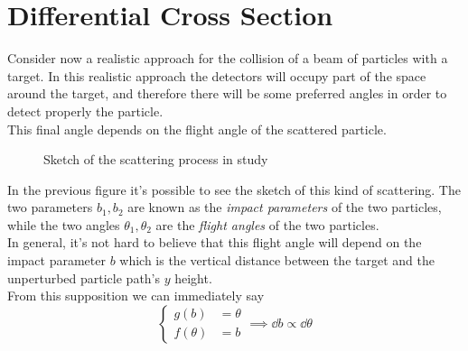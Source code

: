 \documentclass[../qm.tex]{subfiles}
\begin{document}
\section{Differential Cross Section}
Consider now a realistic approach for the collision of a beam of particles with a target. In this realistic approach the detectors will occupy part of the space around the target, and therefore there will be some preferred angles in order to detect properly the particle.\\
This final angle depends on the flight angle of the scattered particle.
\begin{figure}[H]
	\centering
	\caption{Sketch of the scattering process in study}
	\label{fig:diffcsscat}
\end{figure}
In the previous figure it's possible to see the sketch of this kind of scattering. The two parameters $b_1,b_2$ are known as the \emph{impact parameters} of the two particles, while the two angles $\theta_1,\theta_2$ are the \emph{flight angles} of the two particles.\\
In general, it's not hard to believe that this flight angle will depend on the impact parameter $b$ which is the vertical distance between the target and the unperturbed particle path's $y$ height.\\
From this supposition we can immediately say
\begin{equation*}
	\left\{ \begin{aligned}
			g(b)&=\theta\\
			f(\theta)&=b
	\end{aligned}\right.\implies\dd b\propto\dd\theta
\end{equation*}
\end{document}

